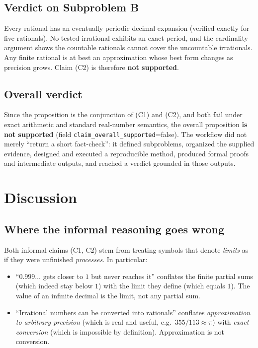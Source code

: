 \documentclass[11pt,a4paper]{article}
\begin{document}
\subsection{Verdict on Subproblem B}
Every rational has an eventually periodic decimal expansion (verified exactly
for five rationals). No tested irrational exhibits an exact period, and the
cardinality argument shows the countable rationals cannot cover the uncountable
irrationals. Any finite rational is at best an approximation whose best form
changes as precision grows. Claim (C2) is therefore \textbf{not supported}.

\subsection{Overall verdict}
Since the proposition is the conjunction of (C1) and (C2), and both fail under
exact arithmetic and standard real-number semantics, the overall proposition
\textbf{is not supported} (field \texttt{claim\_overall\_supported}=false).
The workflow did not merely ``return a short fact-check'': it defined subproblems,
organized the supplied evidence, designed and executed a reproducible method,
produced formal proofs and intermediate outputs, and reached a verdict grounded
in those outputs.

\section{Discussion}
\label{sec:discussion}

\subsection{Where the informal reasoning goes wrong}
Both informal claims (C1, C2) stem from treating symbols that denote \emph{limits}
as if they were unfinished \emph{processes}. In particular:
\begin{itemize}
  \item ``$0.999\ldots$ gets closer to $1$ but never reaches it'' conflates the
        finite partial sums (which indeed stay below $1$) with the limit they
        define (which equals $1$). The value of an infinite decimal is the limit,
        not any partial sum.
  \item ``Irrational numbers can be converted into rationals'' conflates
        \emph{approximation to arbitrary precision} (which is real and useful,
        e.g.\ $355/113\approx\pi$) with \emph{exact conversion} (which is
        impossible by definition). Approximation is not conversion.
\end{itemize}
\end{document}
